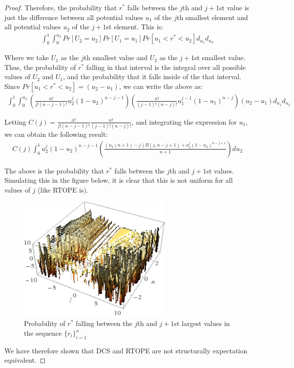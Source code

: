 \documentclass[12pt]{article}
\begin{document}
\begin{proof}
Therefore, the probability that $r^*$ falls between the $j$th and $j+1$st value is just the difference between all potential values $u_1$ of the $j$th smallest element and all potential values $u_2$ of the $j+1$st element. This is:
    \begin{eqnarray}
      \int_{0}^1 \int_0^{u_2} Pr[U_2 = u_2] Pr[U_1 = u_1] Pr[u_1 < r^* < u_2] d_{u_1} d_{u_2}
    \end{eqnarray}

Where we take $U_1$ as the $j$th smallest value and $U_2$ as the $j+1$st smallest value. Thus, the probability of $r^*$ falling in that interval is the integral over all possible values of $U_2$ and $U_1$, and the probability that it falls inside of the that interval. Since $Pr[u_1 < r^* < u_2] = (u_2 - u_1)$, we can write the above as:
\begin{eqnarray}
      \int_{0}^1 \int_0^{u_2} \left( \frac{n!}{j!(n-j-1)!} u_2^j (1 - u_2)^{n-j-1} \right) \left( \frac{n!}{(j-1)!(n-j)!} u_1^{j-1} (1 - u_1)^{n-j} \right) (u_2 - u_1) d_{u_1} d_{u_2}
    \end{eqnarray}

Letting $C(j) = \frac{n!}{j!(n-j-1)!} \frac{n!}{(j-1)!(n-j)!}$, and integrating the expression for $u_1$, we can obtain the following result:
    \begin{eqnarray}
      C(j) \int_0^1 u_2^j (1 - u_2)^{n-j-1} \left( \frac{(u_2 (n+1) - j) B(j, n-j+1) + u_2^j (1-u_2)^{n-j+1}}{n+1} \right) d u_2
    \end{eqnarray}

The above is the probability that $r^*$ falls between the $j$th and $j+1$st values. Simulating this in the figure below, it is clear that this is not uniform for all values of $j$ (like RTOPE is).
    \begin{figure}[H]
      \centering
      \includegraphics[width=3in]{ball_result.png}
      \caption{Probability of $r^*$ falling between the $j$th and $j+1$st largest values in the sequence $\{r_i\}_{i=1}^n$}
    \end{figure}

  We have therefore shown that DCS and RTOPE are not structurally expectation equivalent.
  \end{proof}
\end{document}

